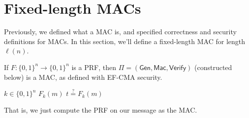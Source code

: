 \newcommand{\nonnegl}{\mathsf{nonnegl}}


\section{Fixed-length MACs}

Previously, we defined what a MAC is, and specified correctness and security definitions for MACs. In this section, we'll define a fixed-length MAC for length $\ell(n)$.

\begin{theorem}
    If $F : \{0, 1\}^n \to \{0, 1\}^n$ is a PRF, then $\Pi = (\mathsf{Gen}, \mathsf{Mac}, \mathsf{Verify})$ (constructed below) is a MAC, as defined with EF-CMA security.

    \begin{algorithmic}[1]
            \State \Return $k \in \{0, 1\}^n$
        \EndFunction
        \Statex
            \State \Return $F_k(m)$
        \EndFunction
        \Statex
            \State \Return $t \overset{?}{=} F_k(m)$
        \EndFunction
    \end{algorithmic}

    That is, we just compute the PRF on our message as the MAC.
\end{theorem}

